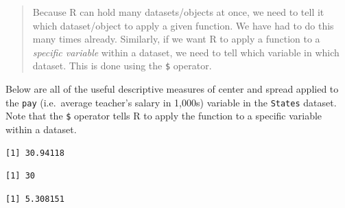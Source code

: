 \documentclass[
]{book}
\makeatletter
\newenvironment{Shaded}{\begin{snugshade}}{\end{snugshade}}
\newcommand{\FunctionTok}[1]{\textcolor[rgb]{0,0,0}{#1}}
\newcommand{\NormalTok}[1]{#1}
\newcommand{\SpecialCharTok}[1]{\textcolor[rgb]{0,0,0}{#1}}
\newenvironment{kframe}{%
\medskip{}
\setlength{\fboxsep}{.8em}
 \def\at@end@of@kframe{}%
 \ifinner\ifhmode%
  \def\at@end@of@kframe{\end{minipage}}%
  \begin{minipage}{\columnwidth}%
 \fi\fi%
 \def\FrameCommand##1{\hskip\@totalleftmargin \hskip-\fboxsep
 \colorbox{shadecolor}{##1}\hskip-\fboxsep
     \hskip-\linewidth \hskip-\@totalleftmargin \hskip\columnwidth}%
 \MakeFramed {\advance\hsize-\width
   \@totalleftmargin\z@ \linewidth\hsize
   \@setminipage}}%
 {\par\unskip\endMakeFramed%
 \at@end@of@kframe}
\renewenvironment{Shaded}{\begin{kframe}}{\end{kframe}}
\makeatother
\begin{document}
\begin{quote}
Because R can hold many datasets/objects at once, we need to tell it which dataset/object to apply a given function. We have had to do this many times already. Similarly, if we want R to apply a function to a \emph{specific variable} within a dataset, we need to tell which variable in which dataset. This is done using the \texttt{\$} operator.
\end{quote}

Below are all of the useful descriptive measures of center and spread applied to the \texttt{pay} (i.e.~average teacher's salary in 1,000s) variable in the \texttt{States} dataset. Note that the \texttt{\$} operator tells R to apply the function to a specific variable within a dataset.

\begin{Shaded}
\end{Shaded}

\begin{verbatim}
[1] 30.94118
\end{verbatim}

\begin{Shaded}
\end{Shaded}

\begin{verbatim}
[1] 30
\end{verbatim}

\begin{Shaded}
\end{Shaded}

\begin{verbatim}
[1] 5.308151
\end{verbatim}

\begin{Shaded}
\end{Shaded}
\end{document}

